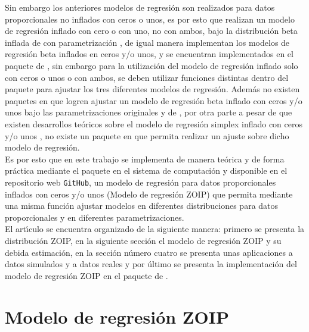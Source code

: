 Sin embargo los anteriores modelos de regresi\'{o}n son realizados para datos proporcionales no inflados con ceros o unos, es por esto que \cite{Ospina1} realizan un modelo de regresi\'{o}n inflado con cero o con uno, no con ambos, bajo la distribuci\'{o}n beta inflada de \cite{Ospina2} con parametrizaci\'{o}n \cite{Ferrari2}, de igual manera \cite{Stasinopoulos2} implementan los modelos de regresi\'{o}n beta inflados en ceros y/o unos, y se encuentran implementados en el paquete  de  \citep{Stasinopoulos1}, sin embargo para la utilizaci\'{o}n del modelo de regresi\'{o}n inflado solo con ceros o unos o con ambos, se deben utilizar funciones distintas dentro del paquete para ajustar los tres diferentes modelos de regresi\'{o}n. Adem\'{a}s no existen paquetes en  que logren ajustar un modelo de regresi\'{o}n beta inflado con ceros y/o unos bajo las parametrizaciones originales y de \cite{Ferrari2}, por otra parte a pesar de que existen desarrollos te\'{o}ricos sobre el modelo de regresi\'{o}n simplex inflado con ceros y/o unos \citep{Galvis1}, no existe un paquete en  que permita realizar un ajuste sobre dicho modelo de regresi\'{o}n.\\

Es por esto que en este trabajo se implementa de manera te\'{o}rica y de forma pr\'{a}ctica mediante el paquete  en el sistema de computaci\'{o}n  \citep{R} y disponible en el repositorio web \verb|GitHub|, un modelo de regresi\'{o}n para datos proporcionales inflados con ceros y/o unos (Modelo de regresi\'{o}n ZOIP) que permita mediante una misma funci\'{o}n ajustar modelos en diferentes distribuciones para datos proporcionales y en diferentes parametrizaciones.\\

El art\'{\i}culo se encuentra organizado de la siguiente manera: primero se presenta la distribuci\'{o}n ZOIP, en la siguiente secci\'{o}n el modelo de regresi\'{o}n ZOIP y su debida estimaci\'{o}n, en la secci\'{o}n n\'{u}mero cuatro se presenta unas aplicaciones a datos simulados y a datos reales y por \'{u}ltimo se presenta la implementaci\'{o}n del modelo de regresi\'{o}n ZOIP en el paquete  de .


\section{Modelo de regresi\'{o}n ZOIP}

